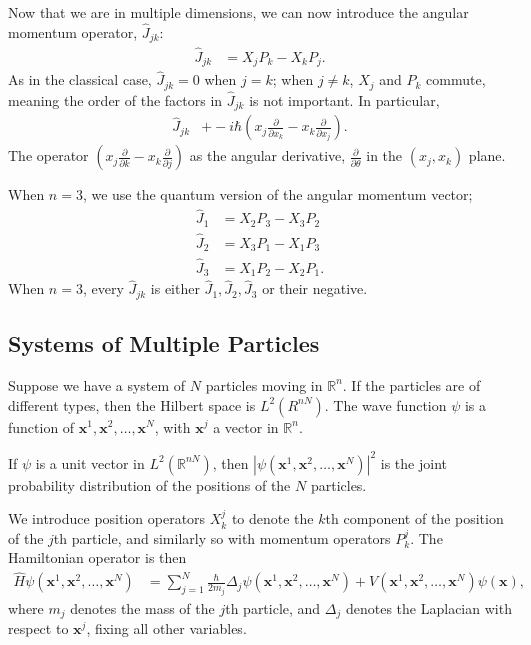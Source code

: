 \documentclass[12pt]{extarticle}
\newcommand{\R}{\mathbb{R}}
\theoremstyle{plain}
\theoremstyle{definition}
\theoremstyle{remark}
\renewcommand{\newline}{\hfill\break}
\begin{document}
  Now that we are in multiple dimensions, we can now introduce the angular momentum operator, $\hat{J}_{jk}$:
  \begin{align*}
    \hat{J}_{jk} &= X_jP_k - X_kP_j.
  \end{align*}
  As in the classical case, $\hat{J}_{jk} = 0$ when $j=k$; when $j\neq k$, $X_j$ and $P_k$ commute, meaning the order of the factors in $\hat{J}_{jk}$ is not important. In particular,
  \begin{align*}
    \hat{J}_{jk} &+ -i\hbar \left(x_j\frac{\partial}{\partial x_k} - x_k\frac{\partial}{\partial x_j}\right).
  \end{align*}
  The operator $\displaystyle \left(x_j\frac{\partial}{\partial k} - x_k\frac{\partial}{\partial j}\right)$ as the angular derivative, $\frac{\partial}{\partial \theta}$ in the $(x_j,x_k)$ plane.\newline

  When $n=3$, we use the quantum version of the angular momentum vector;
  \begin{align*}
    \hat{J}_1 &= X_2P_3 - X_3P_2\\
    \hat{J}_2 &= X_3P_1 - X_1P_3\\
    \hat{J}_3 &= X_1P_2 - X_2P_1.
  \end{align*}
  When $n=3$, every $\hat{J}_{jk}$ is either $\hat{J}_1,\hat{J}_2,\hat{J}_3$ or their negative.
  \subsection{Systems of Multiple Particles}%
  Suppose we have a system of $N$ particles moving in $\R^n$. If the particles are of different types, then the Hilbert space is $L^2(R^{nN})$. The wave function $\psi$ is a function of $\mathbf{x}^1,\mathbf{x}^2,\dots,\mathbf{x}^N$, with $\mathbf{x}^j$ a vector in $\R^n$.\newline

  If $\psi$ is a unit vector in $L^{2}(\R^{nN})$, then $|\psi(\mathbf{x}^1,\mathbf{x}^2,\dots,\mathbf{x}^N)|^2$ is the joint probability distribution of the positions of the $N$ particles.\newline

  We introduce position operators $X_{k}^{j}$ to denote the $k$th component of the position of the $j$th particle, and similarly so with momentum operators $P_{k}^{j}$. The Hamiltonian operator is then
  \begin{align*}
    \hat{H}\psi\left(\mathbf{x}^1,\mathbf{x}^2,\dots,\mathbf{x}^N\right) &= \sum_{j=1}^{N}\frac{\hbar}{2m_j}\Delta_{j}\psi(\mathbf{x}^1,\mathbf{x}^2,\dots,\mathbf{x}^N) + V(\mathbf{x}^1,\mathbf{x}^2,\dots,\mathbf{x}^N)\psi(\mathbf{x}),
  \end{align*}
  where $m_j$ denotes the mass of the $j$th particle, and $\Delta_{j}$ denotes the Laplacian with respect to $\mathbf{x}^j$, fixing all other variables.\newline
\end{document}
